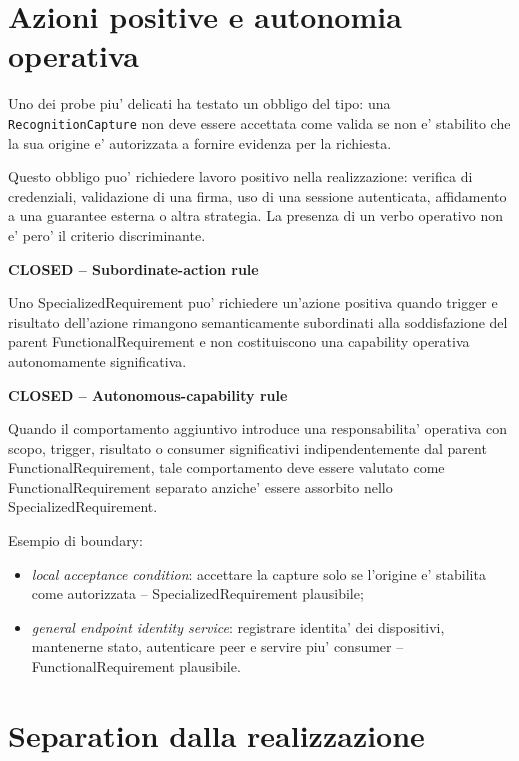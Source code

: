\documentclass[11pt,a4paper]{article}
\newcommand{\closed}{\textbf{CLOSED}}
\newenvironment{statusbox}[1]{%
  \def\FrameCommand{\fcolorbox{ddtablue}{ddtagray}}%
  \MakeFramed{\advance\hsize-2\width\FrameRestore}
  \noindent\textbf{#1}\par\smallskip
}{\endMakeFramed}
\begin{document}
\section{Azioni positive e autonomia operativa}

Uno dei probe piu' delicati ha testato un obbligo del tipo: una \texttt{RecognitionCapture} non deve essere accettata come valida se non e' stabilito che la sua origine e' autorizzata a fornire evidenza per la richiesta.

Questo obbligo puo' richiedere lavoro positivo nella realizzazione: verifica di credenziali, validazione di una firma, uso di una sessione autenticata, affidamento a una guarantee esterna o altra strategia. La presenza di un verbo operativo non e' pero' il criterio discriminante.

\begin{statusbox}{\closed{} -- Subordinate-action rule}
Uno SpecializedRequirement puo' richiedere un'azione positiva quando trigger e risultato dell'azione rimangono semanticamente subordinati alla soddisfazione del parent FunctionalRequirement e non costituiscono una capability operativa autonomamente significativa.
\end{statusbox}

\begin{statusbox}{\closed{} -- Autonomous-capability rule}
Quando il comportamento aggiuntivo introduce una responsabilita' operativa con scopo, trigger, risultato o consumer significativi indipendentemente dal parent FunctionalRequirement, tale comportamento deve essere valutato come FunctionalRequirement separato anziche' essere assorbito nello SpecializedRequirement.
\end{statusbox}

Esempio di boundary:
\begin{itemize}
  \item \emph{local acceptance condition}: accettare la capture solo se l'origine e' stabilita come autorizzata -- SpecializedRequirement plausibile;
  \item \emph{general endpoint identity service}: registrare identita' dei dispositivi, mantenerne stato, autenticare peer e servire piu' consumer -- FunctionalRequirement plausibile.
\end{itemize}

\section{Separation dalla realizzazione}
\end{document}
